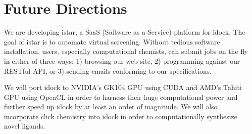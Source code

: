 \documentclass[10pt,conference,compsocconf]{../IEEEtran}
\begin{document}
\section{Future Directions}

We are developing istar, a SaaS (Software as a Service) platform for idock. The goal of istar is to automate virtual screening. Without tedious software installation, users, especially computational chemists, can submit jobs on the fly in either of three ways: 1) browsing our web site, 2) programming against our RESTful API, or 3) sending emails conforming to our specifications.

We will port idock to NVIDIA's GK104 GPU using CUDA and AMD's Tahiti GPU using OpenCL in order to harness their huge computational power and further speed up idock by at least an order of magnitude. We will also incorporate click chemistry into idock in order to computationally synthesize novel ligands.



\end{document}
